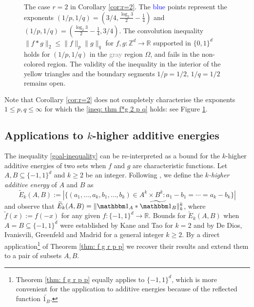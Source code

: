 \documentclass[reqno, 10pt]{amsart}
\theoremstyle{plain}
\numberwithin{equation}{section}
\theoremstyle{definition}
\newtheorem*{induction hypothesis}{Induction hypothesis}
\theoremstyle{remark}
\newcommand{\R}{\mathbb{R}}
\newcommand{\Z}{\mathbb{Z}}
\def\bbone{{\mathbbm 1}}
\begin{document}
\begin{figure}
  \caption{The case $r=2$ in Corollary \ref{cor:r=2}. The \textcolor{blue}{blue} points represent the exponents $(1/p,1/q) = (3/4, \frac{\log_2 3}{2} - \frac{1}{4})$ and $(1/p,1/q) = (\frac{\log_2 3}{2} - \frac{1}{4}, 3/4)$. The convolution inequality $\|f \ast g\|_2 \leq \|f\|_p \|g\|_q$ for $f,g:\Z^d\to \R$ supported in $\{0,1\}^d$ holds for $(1/p,1/q)$ in the \textcolor{gray}{gray} region $\Omega$, and fails in the non-colored region. The validity of the inequality in the interior of the yellow triangles and the boundary segments $1/p=1/2$, $1/q=1/2$ remains open.}
  \label{fig:region-plot}
\end{figure}


Note that Corollary \ref{cor:r=2} does not completely characterise the exponents $1 \leq p,q \leq \infty$ for which the \eqref{ineq: thm f*g 2 p q} holds:  see Figure \ref{fig:region-plot}.


\subsection{Applications to $k$-higher additive energies}

The inequality \eqref{goal-inequality} can be re-interpreted as a bound for the $k$-higher additive energies of two sets when $f$ and $g$ are characteristic functions. Let $A, B \subseteq \{-1,1\}^d$ and $k \geq 2$ be an integer. Following \cite{Shkredov, SS}, we define the \textit{$k$-higher additive energy} of $A$ and $B$ as
\[
\widetilde{E}_{k}(A,B):=|\{(a_1,\dots,a_{k}, b_1, \dots, b_k) \in A^{k} \times B^k : a_1-b_1= \cdots = a_{k} - b_{k}\}|
\]
and observe that $\widetilde{E}_k(A,B)=\| \bbone_{A} \ast \widetilde{\bbone_B}\|_{k}^k$, where $\widetilde{f}(x):=f(-x)$ for any given $f : \{-1,1\}^{d} \to \R$. Bounds for $\widetilde{E}_k(A,B)$ when $A=B \subseteq \{-1,1\}^d$  were established by Kane and Tao \cite{KT} for $k=2$ and by De Dios, Ivanisvili, Greenfeld and Madrid \cite{DGIM} for a general integer $k \geq 2$. By a direct application\footnote{Theorem \ref{thm: f g r p p} equally applies to $\{-1,1\}^d$, which is more convenient for the application to additive energies because of the reflected function $\widetilde{1_B}$.} of Theorem \ref{thm: f g r p p} we recover their results and extend them to a pair of subsets $A,B$.
\end{document}
